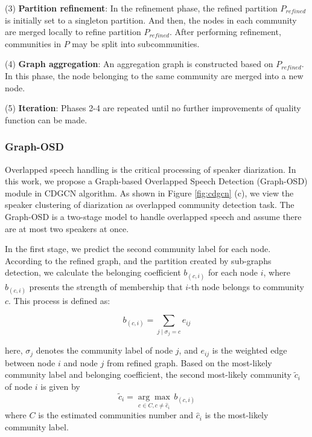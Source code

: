\documentclass[10pt]{article}
\begin{document}
(3) \textbf{Partition refinement}: In the refinement phase, the refined partition $P_{refined}$ is initially set to a singleton partition. And then, the nodes in each community are merged locally to refine partition $P_{refined}$. After performing refinement, communities in $P$ may be split into subcommunities.

(4) \textbf{Graph aggregation}: An aggregation graph is constructed based on $P_{refined}$. In this phase, the node belonging to the same community are merged into a new node. 

(5) \textbf{Iteration}: Phases 2-4 are repeated until no further improvements of quality function can be made.

\subsubsection{Graph-OSD}

Overlapped speech handling is the critical processing of speaker diarization. In this work, we propose a Graph-based Overlapped Speech Detection (Graph-OSD) module in CDGCN algorithm. As shown in Figure \ref{fig:cdgcn} (c), we view the speaker clustering of diarization as overlapped community detection task. The Graph-OSD is a two-stage model to handle overlapped speech and assume there are at most two speakers at once. 

In the first stage, we predict the second community label for each node. According to the refined graph, and the partition created by sub-graphs detection, we calculate the belonging coefficient $b_{(c,i)}$ for each node $i$, where $b_{(c,i)}$ presents the strength of membership that $i$-th node belongs to community $c$. This process is defined as:
\vspace{-0.5cm}
\begin{center}
\begin{equation}
b_{(c,i)} = \sum_{j \mid \sigma_j = c} e_{i j}
\end{equation}
\end{center}
here, $\sigma_j$ denotes the community label of node $j$, and $e_{i j}$ is the weighted edge between node $i$ and node $j$ from refined graph. Based on the most-likely community label and belonging coefficient, the second most-likely community $\widetilde{c}_i$ of node $i$ is given by
\begin{equation}
\tilde{c}_{i}=\underset{c \in C,c \neq \hat{c}_{i}}{\arg\max}\, b_{(c, i)}
\end{equation}
where $C$ is the estimated communities number and $\hat{c}_i$ is the most-likely community label.
\end{document}

